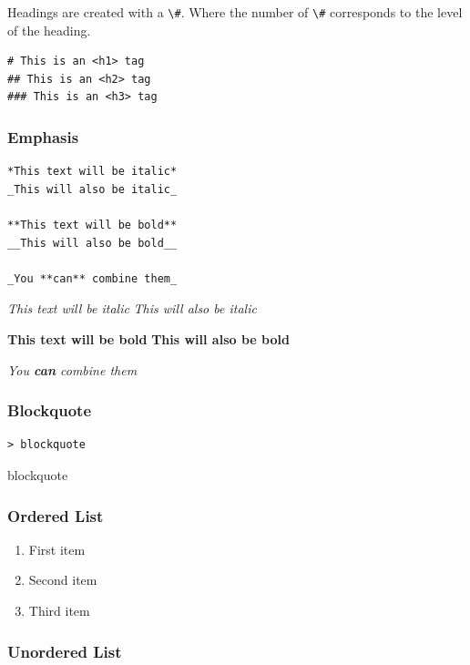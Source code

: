 \documentclass[
  a4paper,
  ,captions=tableheading
]{scrartcl}
\newcommand{\passthrough}[1]{#1}
\providecommand{\tightlist}{%
  \setlength{\itemsep}{0pt}\setlength{\parskip}{0pt}}
\renewenvironment{quote}{\begin{customblockquote}\list{}{\rightmargin=0em\leftmargin=0em}%
\item\relax\color{blockquote-text}\ignorespaces}{\unskip\unskip\endlist\end{customblockquote}}
\begin{document}
Headings are created with a \passthrough{\lstinline!\#!}. Where the
number of \passthrough{\lstinline!\#!} corresponds to the level of the
heading.

\begin{lstlisting}
# This is an <h1> tag
## This is an <h2> tag
### This is an <h3> tag
\end{lstlisting}

\subsubsection{Emphasis}\label{emphasis}

\begin{lstlisting}
*This text will be italic*
_This will also be italic_

**This text will be bold**
__This will also be bold__

_You **can** combine them_
\end{lstlisting}

\emph{This text will be italic} \emph{This will also be italic}

\textbf{This text will be bold} \textbf{This will also be bold}

\emph{You \textbf{can} combine them}

\subsubsection{Blockquote}\label{blockquote}

\begin{lstlisting}
> blockquote
\end{lstlisting}

\begin{quote}
blockquote
\end{quote}

\subsubsection{Ordered List}\label{ordered-list}

\begin{enumerate}
\def\labelenumi{\arabic{enumi}.}
\tightlist
\item
  First item
\item
  Second item
\item
  Third item
\end{enumerate}

\subsubsection{Unordered List}\label{unordered-list}
\end{document}
